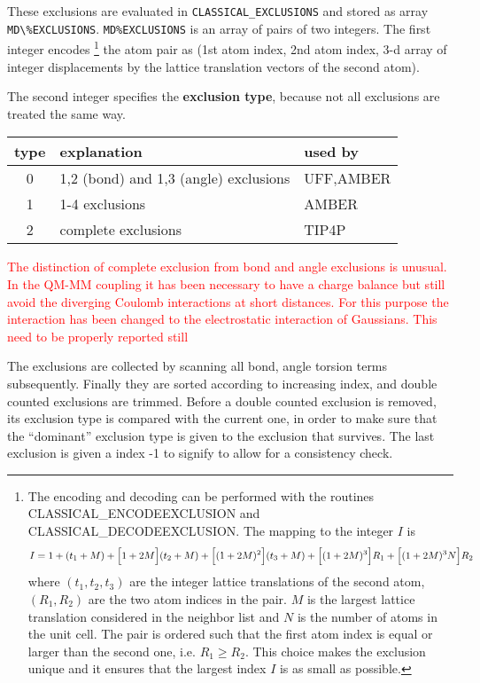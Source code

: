 \documentclass[11pt,a4paper]{report}
\begin{document}
These exclusions are evaluated in \verb|CLASSICAL_EXCLUSIONS| and
stored as array \verb|MD\%EXCLUSIONS|. \verb|MD%EXCLUSIONS| is an
array of pairs of two integers. The first integer encodes
\footnote{The encoding and decoding can be performed with the routines
  CLASSICAL\_ENCODEEXCLUSION and CLASSICAL\_DECODEEXCLUSION. The mapping to the integer $I$ is
\begin{eqnarray}
I=1+(t_1+M)
+\Bigl[1+2M\Bigr](t_2+M)
+\Bigl[(1+2M)^2\Bigr](t_3+M)
+\Bigl[(1+2M)^3\Bigr]R_1
+\Bigl[(1+2M)^3N\Bigr] R_2
\end{eqnarray}
where $(t_1,t_2,t_3)$ are the integer lattice translations of the
second atom, $(R_1,R_2)$ are the two atom indices in the pair. $M$ is
the largest lattice translation considered in the neighbor list and
$N$ is the number of atoms in the unit cell.  The pair is ordered such
that the first atom index is equal or larger than the second one,
i.e. $R_1\ge R_2$. This choice makes the exclusion unique and it
ensures that the largest index $I$ is as small as possible.
} 
the atom pair as (1st
atom index, 2nd atom index, 3-d array of integer displacements by the
lattice translation vectors of the second atom).

The second integer specifies the \textbf{exclusion
  type}, because not all exclusions are treated
the same way.
\begin{center}
\begin{tabular}{|c|l|l|}
\hline
type & explanation & used by \\
\hline
0 & 1,2 (bond) and 1,3 (angle) exclusions & UFF,AMBER\\
1 & 1-4 exclusions                        & AMBER \\
2 & complete exclusions                   & TIP4P \\
\hline
\end{tabular}
\end{center}
\textcolor{red}{The distinction of complete exclusion from bond and
  angle exclusions is unusual. In the QM-MM coupling it has been
  necessary to have a charge balance but still avoid the diverging
  Coulomb interactions at short distances. For this purpose the
  interaction has been changed to the electrostatic interaction of
  Gaussians. This need to be properly reported still}

The exclusions are collected by scanning all bond, angle torsion terms
subsequently. Finally they are sorted according to increasing index,
and double counted exclusions are trimmed. Before a double counted
exclusion is removed, its exclusion type is compared with the current
one, in order to make sure that the ``dominant'' exclusion type is
given to the exclusion that survives. The last exclusion is given a
index -1 to signify to allow for a consistency check.
\end{document}
